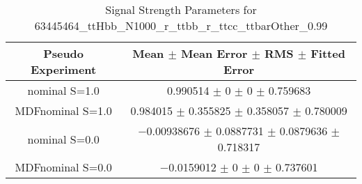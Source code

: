\begin{table}
\centering
\caption{Signal Strength Parameters for 63445464\_ttHbb\_N1000\_r\_ttbb\_r\_ttcc\_ttbarOther\_0.99}
\begin{tabular}{cc}
\toprule
Pseudo Experiment & Mean $\pm$ Mean Error $\pm$ RMS $\pm$ Fitted Error\\
\midrule
nominal S=1.0 & \num{0.990514} $\pm$ \num{0} $\pm$ \num{0} $\pm$ \num{0.759683}\\
MDFnominal S=1.0 & \num{0.984015} $\pm$ \num{0.355825} $\pm$ \num{0.358057} $\pm$ \num{0.780009}\\
nominal S=0.0 & \num{-0.00938676} $\pm$ \num{0.0887731} $\pm$ \num{0.0879636} $\pm$ \num{0.718317}\\
MDFnominal S=0.0 & \num{-0.0159012} $\pm$ \num{0} $\pm$ \num{0} $\pm$ \num{0.737601}\\
\bottomrule
\end{tabular}
\end{table}